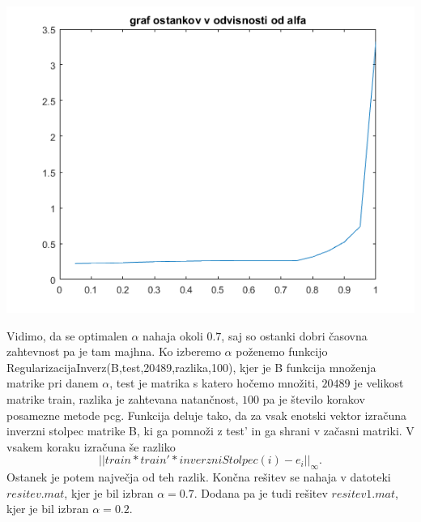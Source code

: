 \documentclass[11pt]{article} %
\begin{document}
\begin{centering}
\includegraphics[scale=0.4]{ostanek}
\end{centering}


Vidimo, da se optimalen $\alpha$ nahaja okoli $0.7$, saj so ostanki dobri časovna zahtevnost pa je tam majhna. Ko izberemo $\alpha$ poženemo funkcijo RegularizacijaInverz(B,test,20489,razlika,100), kjer je B funkcija množenja matrike pri danem $\alpha$, test je matrika s katero hočemo množiti, $20489$ je velikost matrike train, razlika je zahtevana natančnost, $100$ pa je število korakov posamezne metode pcg. Funkcija deluje tako, da za vsak enotski vektor izračuna inverzni stolpec matrike B, ki ga pomnoži z test' in ga shrani v začasni matriki. V vsakem koraku izračuna še razliko
$$||train*train'*inverzniStolpec(i) - e_i||_{\infty}.$$
Ostanek je potem največja od teh razlik. Končna rešitev se nahaja v datoteki $resitev.mat$, kjer je bil izbran $\alpha=0.7$. Dodana pa je tudi rešitev $resitev1.mat$, kjer je bil izbran $\alpha=0.2$.
\end{document}
